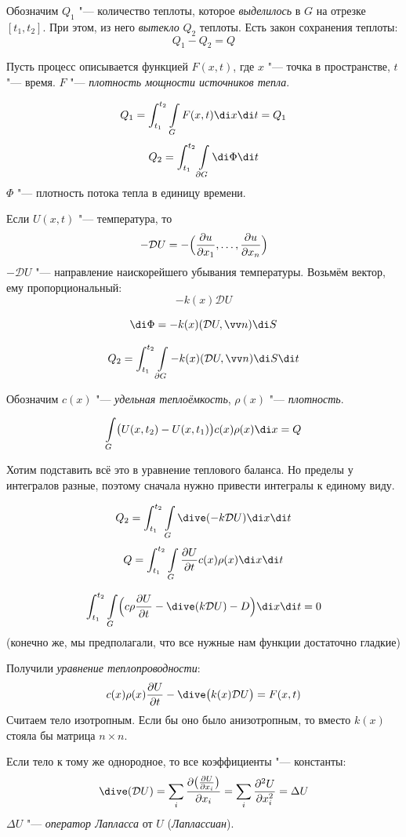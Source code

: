 Обозначим $ Q_1 $ "--- количество теплоты, которое \emph{выделилось} в $ G $ на отрезке $ [t_1, t_2] $.
При этом, из него \emph{вытекло} $ Q_2 $ теплоты.
Есть закон сохранения теплоты:
$$ Q_1 - Q_2 = Q $$

Пусть процесс описывается функцией $ F(x, t) $, где $ x $ "--- точка в пространстве,
$ t $ "--- время.
$ F $ "--- \emph{плотность мощности источников тепла}.

$$ Q_1 = \int_{t_1}^{t_2} \int\limits_G F(x, t) \di x \di t = Q_1 $$
$$ Q_2 = \int_{t_1}^{t_2} \int\limits_{\partial G} \di \Phi \di t $$
$ \Phi $ "--- плотность потока тепла в единицу времени.

Если $ U(x, t) $ "--- температура, то
$$ -\mathcal D U = -\Bigl( \frac{\partial u}{\partial x_1}, \dots, \frac{\partial u}{\partial x_n} \Bigr) $$
$ -\mathcal D U $ "--- направление наискорейшего убывания температуры.
Возьмём вектор, ему пропорциональный:
$$ -k(x) \mathcal DU $$

$$ \di \Phi = -k(x) (\mathcal D U, \vv n) \di S $$

$$ Q_2 = \int_{t_1}^{t_2} \int\limits_{\partial G} -k(x) (\mathcal D U, \vv n) \di S \di t $$

Обозначим $ c(x) $ "--- \emph{удельная теплоёмкость}, $ \rho(x) $ "--- \emph{плотность}.

$$ \int\limits_G \bigl( U(x, t_2) - U(x, t_1) \bigr) c(x) \rho(x) \di x = Q $$

Хотим подставить всё это в уравнение теплового баланса.
Но пределы у интегралов разные, поэтому сначала нужно привести интегралы к единому виду.

$$ Q_2 = \int_{t_1}^{t_2} \int\limits_G \dive (-k \mathcal D U) \di x \di t $$
$$ Q = \int_{t_1}^{t_2} \int\limits_G \frac{\partial U}{\partial t} c(x) \rho(x) \di x \di t $$

$$ \int_{t_1}^{t_2} \int\limits_G \Bigl( c \rho \frac{\partial U}{\partial t} -
\dive (k \mathcal D U) - D \Bigr) \di x \di t = 0 $$
(конечно же, мы предполагали, что все нужные нам функции достаточно гладкие)

Получили \emph{уравнение теплопроводности}:
$$ c(x) \rho(x) \frac{\partial U}{\partial t} - \dive \bigl( k(x) \mathcal D U \bigr) = F(x, t) $$
Считаем тело изотропным.
Если бы оно было анизотропным, то вместо $ k(x) $ стояла бы матрица $ n \times n $.

Если тело к тому же однородное, то все коэффициенты "--- константы:
$$ \dive (\mathcal D U) =
\sum_i \frac{ \partial \bigl( \frac{\partial U}{\partial x_i} \bigr)}{\partial x_i} =
\sum_i \frac{\partial^2 U}{\partial x_i^2} = \Delta U $$
$ \Delta U $ "--- \emph{оператор Лапласса} от $ U $ (\emph{Лаплассиан}).

